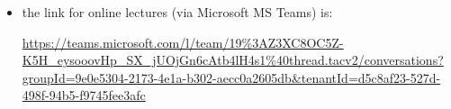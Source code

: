\documentclass[trans]{beamer}
\newenvironment{stepitemize}{\begin{itemize}[<+->]}{\end{itemize} }
\begin{document}
\begin{frame}
\begin{stepitemize}
\begin{stepitemize}
\item the link for online lectures (via Microsoft MS Teams) is:

\url{https://teams.microsoft.com/l/team/19\%3AZ3XC8OC5Z-K5H_eysooovHp_SX_jUOjGn6cAtb4lH4s1\%40thread.tacv2/conversations?groupId=9e0e5304-2173-4e1a-b302-aecc0a2605db&tenantId=d5c8af23-527d-498f-94b5-f9745fee3afc}%
\end{stepitemize}
\end{stepitemize}

\transboxout%
\end{frame}%
\end{document}
